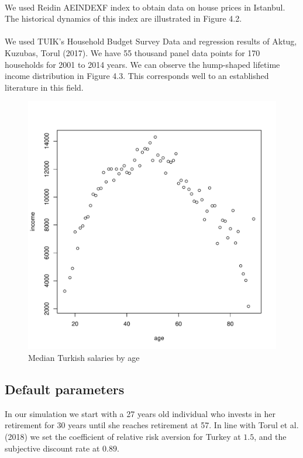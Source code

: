 \paragraph{}We used Reidin AEINDEXF index to obtain data on house prices in Istanbul. The historical dynamics of this index are illustrated in Figure 4.2.

\paragraph{}We used TUIK's Household Budget Survey Data and regression results of Aktug, Kuzubas, Torul (2017). We have 55 thousand panel data points for 170 households for 2001 to 2014 years. We can observe the hump-shaped lifetime income distribution in Figure 4.3. This corresponds well to an established literature in this field.

\begin{figure}[h]
	\centering
	\includegraphics[scale=0.5]{figs/wage2median.pdf}
	\caption{Median Turkish salaries by age}
\end{figure}

\subsection{Default parameters}
In our simulation we start with a 27 years old individual who invests in her retirement for 30 years until she reaches retirement at 57. In line with Torul et al. (2018) we set the coefficient of relative risk aversion for Turkey at $1.5$, and the subjective discount rate at $0.89$.

